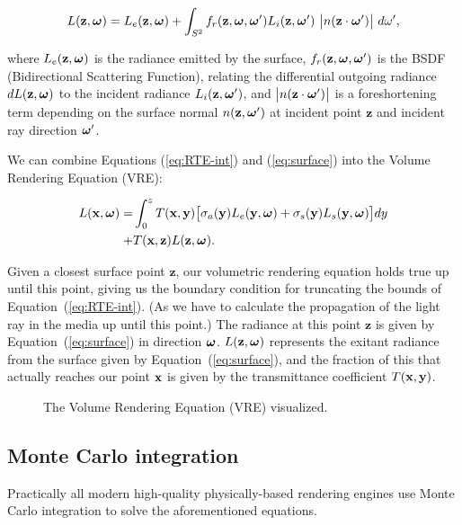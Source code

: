 \begin{equation}\label{eq:surface}
    L(\textbf{z}, \boldsymbol{\omega}) = L_e(\textbf{z}, \boldsymbol{\omega}) +
    \int_{S^2} f_r(\textbf{z},\boldsymbol{\omega},\boldsymbol{\omega}')L_i(\textbf{z},\boldsymbol{\omega}')
    ~\big| n(\textbf{z}\cdot \boldsymbol{\omega}')\big|~ d \omega' ,
\end{equation}

\noindent where $L_e(\textbf{z}, \boldsymbol{\omega})$ is the radiance emitted by the surface, $f_r(\textbf{z},\boldsymbol{\omega},\boldsymbol{\omega}')$ is the BSDF (Bidirectional Scattering Function), relating the differential outgoing radiance $dL(\textbf{z},\boldsymbol{\omega})$ to the incident radiance $L_i(\textbf{z}, \boldsymbol{\omega}')$,
and $\big| n(\textbf{z}\cdot \boldsymbol{\omega}')\big|$ is a foreshortening term depending on the surface normal $n(\textbf{z},\boldsymbol{\omega}')$ at incident point $\textbf{z}$ and incident ray direction $\boldsymbol{\omega}'$.

We can combine Equations (\ref{eq:RTE-int}) and (\ref{eq:surface}) into the Volume Rendering Equation (VRE):

\begin{align}
\begin{aligned}
\label{eq:VRE}
L(\textbf{x}, \boldsymbol{\omega}) = &\int_{0}^{z} 
    T(\textbf{x}, \textbf{y})
    \big[ 
        \sigma_a(\textbf{y})L_e(\textbf{y}, \boldsymbol{\omega}) + 
        \sigma_s(\textbf{y})L_s(\textbf{y}, \boldsymbol{\omega})
    \big] dy
    \\ + 
    &T(\textbf{x}, \textbf{z})L(\textbf{z},\boldsymbol{\omega}).
\end{aligned}
\end{align}

Given a closest surface point $\textbf{z}$, our volumetric rendering equation holds true up until this point, giving us the boundary condition for truncating the bounds of Equation~(\ref{eq:RTE-int}). (As we have to calculate the propagation of the light ray in the media up until this point.) 
The radiance at this point $\textbf{z}$ is given by Equation~(\ref{eq:surface}) in direction $\boldsymbol{\omega}$. 
$L(\textbf{z}, \boldsymbol{\omega})$ represents the exitant radiance from the surface given by Equation~(\ref{eq:surface}), and the fraction of this that actually reaches our point $\textbf{x}$ is given by the transmittance coefficient $T(\textbf{x}, \textbf{y})$. 

\begin{figure}[ht]
    \centering
    \caption{The Volume Rendering Equation (VRE) visualized.}
    \label{fig:vre}
\end{figure}

\subsection{Monte Carlo integration}
Practically all modern high-quality physically-based rendering engines use Monte Carlo integration to solve the aforementioned equations.

